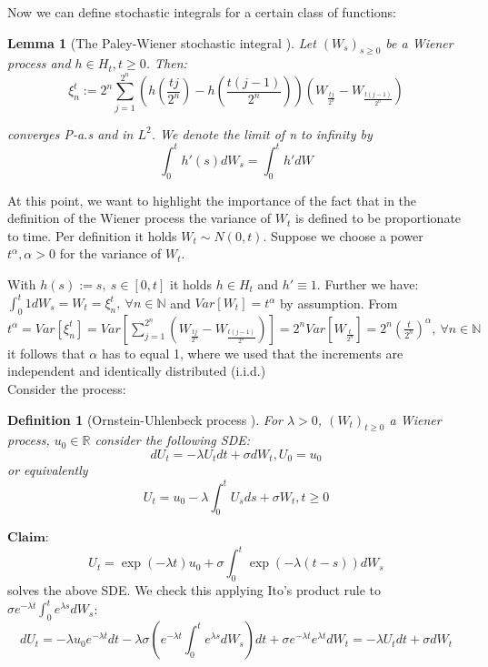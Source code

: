 \documentclass[%
thesis=student,%
coverpage=false,%
titlepage=false,%
headmarks=true, %
english,%
font=libertine, %
math=newpxtx, %
BCOR=5mm,%
coverBCOR=11mm%
]{tumbook}
\newtheorem{definition}{Definition}[section]
\newtheorem{lemma}{Lemma}
\begin{document}
Now we can define stochastic integrals for a certain class of functions:

\begin{lemma}[The Paley-Wiener stochastic integral \cite{gantert:2024}] 
Let $(W_{s})_{s\geq 0}$ be a Wiener process and $h \in H_{t}, t \geq 0$. Then:
\[
\xi_{n}^{t} := 2^{n}\sum_{j=1}^{2^{n}}(h(\frac{tj}{2^{n}})-h(\frac{t(j-1)}{2^{n}}))(W_{\frac{tj}{2^{n}}}-W_{\frac{t(j-1)}{2^{n}}}) 
\]

converges P-a.s and in $L^{2}$. We denote the limit of n to infinity by
\[
\int_{0}^{t}h'(s)dW_{s} = \int_{0}^{t}h'dW
\]
\end{lemma}

At this point, we want to highlight the importance of the fact that in the definition of the Wiener process the variance of $W_{t}$ is defined to be proportionate to time. Per definition it holds $W_{t} \sim N(0,t)$. Suppose we choose a power $t^{\alpha}, \alpha > 0$ for the variance of $W_{t}$. 

With $h(s) := s, \ s \in [0,t]$ it holds $h \in H_{t}$ and $h' \equiv 1$. Further we have: $\int_{0}^{t} 1 dW_{s} = W_{t} = \xi_{n}^{t}, \ \forall n \in \mathbb{N}$ and $Var[W_{t}] = t^{\alpha}$ by assumption. From 
$t^{\alpha} = Var[\xi_{n}^{t}] = Var\left[\sum_{j=1}^{2^{n}}\left(W_{\frac{tj}{2^{n}}} - W_{\frac{t(j-1)}{2^{n}}}\right)\right] = 2^{n}Var\left[W_{\frac{t}{2^n}}\right] = 2^{n}\left(\frac{t}{2^{n}}\right)^{\alpha}, \ \forall n \in \mathbb{N}$ it follows that $\alpha$ has to equal 1, where we used that the increments are independent and identically distributed (i.i.d.)  \\

Consider the process:

\begin{definition}[Ornstein-Uhlenbeck process \cite{gantert:2024}] 
For $\lambda > 0$, $(W_{t})_{t\geq 0}$ a Wiener process, $u_{0} \in \mathbb{R}$ consider the following SDE:
\[
dU_{t} = -\lambda U_{t} dt + \sigma dW_{t}, U_{0} = u_{0}
\]
\label{def:OU process}
or equivalently
\[
U_{t} = u_{0} - \lambda\int_{0}^{t}U_{s}ds + \sigma W_{t}, t \geq 0
\]  
\end{definition}

$\textbf{Claim}$: 
\[
U_{t} = \exp(-\lambda t)u_{0} + \sigma\int_{0}^{t}\exp(-\lambda (t-s))dW_{s}
\]
solves the above SDE. We check this applying Ito's product rule to $\sigma e^{-\lambda t}\int_{0}^{t}e^{\lambda s}dW_{s}$:
\[
dU_{t} = -\lambda u_{0}e^{-\lambda t}dt - \lambda\sigma(e^{-\lambda t}\int_{0}^{t}e^{\lambda s}dW_{s})dt + \sigma e^{-\lambda t}e^{\lambda t}dW_{t} = -\lambda U_{t} dt + \sigma dW_{t}
\]
\end{document}
